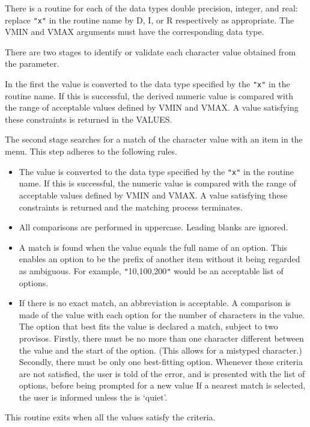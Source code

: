 \documentclass[twoside,11pt,nolof]{starlink}
\begin{document}
{{{         \sstitem
         There is a routine for each of the data types double precision,
         integer, and real: replace \texttt{"x"} in the routine name by D, I, or R
         respectively as appropriate.  The VMIN and VMAX arguments must
         have the corresponding data type.

         \sstitem
         There are two stages to identify or validate each character
         value obtained from the parameter.

      In the first the value is converted to the data type specified by
      the \texttt{"x"} in the routine name.  If this is successful, the derived
      numeric value is compared with the range of acceptable values
      defined by VMIN and VMAX.  A value satisfying these constraints
      is returned in the VALUES.

      The second stage searches for a match of the character value with
      an item in the menu.  This step adheres to the following rules.
         \begin{itemize}
         \item  The value is converted to the data type specified by the
         \texttt{"x"} in the routine name.  If this is successful, the numeric
         value is compared with the range of acceptable values defined
         by VMIN and VMAX.  A value satisfying these constraints is
         returned and the matching process terminates.
         \item  All comparisons are performed in uppercase.  Leading blanks
         are ignored.
         \item  A match is found when the value equals the full name of an
         option.  This enables an option to be the prefix of another
         item without it being regarded as ambiguous.  For example,
         \texttt{"}10,100,200\texttt{"} would be an acceptable list of options.
         \item If there is no exact match, an abbreviation is acceptable.
         A comparison is made of the value with each option for the
         number of characters in the value.  The option that best fits
         the value is declared a match, subject to two provisos.
         Firstly, there must be no more than one character different
         between the value and the start of the option.  (This allows
         for a mistyped character.)  Secondly, there must be only one
         best-fitting option.  Whenever these criteria are not
         satisfied, the user is told of the error, and is presented
         with the list of options, before being prompted for a new value
         If a nearest match is selected, the user is informed unless the
 is `quiet'.
         \end{itemize}

      This routine exits when all the values satisfy the criteria.
      }
   }
}
\end{document}
